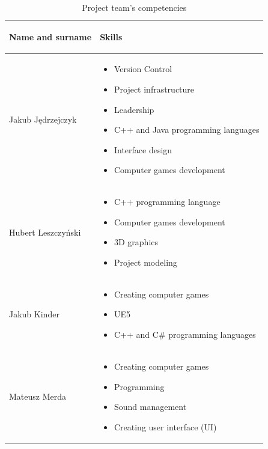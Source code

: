 \begin{table}[!ht]
\caption{Project team's competencies}
\label{tab:team}
\small
\begin{tabular}{|p{}|p{}|}
\hline
   \begin{center}
       \textbf{Name and surname}
   \end{center}  
   &
   \begin{center}
       \textbf{Skills}
   \end{center}
   \\\hline
    Jakub Jędrzejczyk 
    & \begin{itemize}
        \item Version Control
        \item Project infrastructure
        \item Leadership
        \item C++ and Java programming languages
        \item Interface design
        \item Computer games development
    \end{itemize} 
    \\\hline
    Hubert Leszczyński
    & \begin{itemize}
        \item C++ programming language
        \item Computer games development
        \item 3D graphics
        \item Project modeling
    \end{itemize}
    \\\hline
    Jakub Kinder
    & \begin{itemize}
        \item Creating computer games
        \item UE5
        \item C++ and C\# programming languages
    \end{itemize}
    \\\hline
    Mateusz Merda
    & \begin{itemize}
        \item Creating computer games
        \item Programming
        \item Sound management
        \item Creating user interface (UI)
    \end{itemize}
    \\\hline
\end{tabular}
\end{table}
